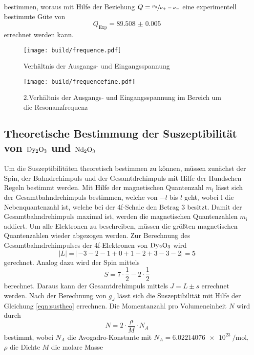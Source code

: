 bestimmen, woraus mit Hilfe der Beziehung $Q = \sfrac{\nu_0}{\nu_+ - \nu_-}$ eine experimentell bestimmte Güte von 
\begin{equation*}
    Q_\text{Exp} = \num{89.508(5)}
\end{equation*}
errechnet werden kann.
\begin{figure}
    \centering
    \caption{Verhältnis der Ausgangs- und Eingangsspannung}
    \label{fig:frequence}
    \texttt{[image: build/frequence.pdf]}
\end{figure}
\begin{figure}
    \centering
    \caption{2.Verhältnis der Ausgangs- und Eingangsspannung im Bereich um die Resonanzfrequenz}
    \label{fig:frequencefine}
    \texttt{[image: build/frequencefine.pdf]}
\end{figure}
\FloatBarrier
\subsection{Theoretische Bestimmung der Suszeptibilität von $\ce{Dy2O3}$ und $\ce{Nd2O3}$}
Um die Suszeptibilitäten theoretisch bestimmen zu können, müssen zunächst der Spin, der Bahndrehimpuls und der Gesamtdrehimpuls mit Hilfe der Hundschen 
Regeln bestimmt werden.
Mit Hilfe der magnetischen Quantenzahl $m_l$ lässt sich der Gesamtbahndrehimpuls bestimmen, welche von $-l$ bis $l$ geht, wobei l die 
Nebenquantenzahl ist, welche bei der 4f-Schale den Betrag $3$ besitzt. 
Damit der Gesamtbahndrehimpuls maximal ist, werden die magnetischen Quantenzahlen $m_l$ addiert. 
Um alle Elektronen zu beschreiben, müssen die größten magnetischen Quantenzahlen wieder abgezogen werden.
Zur Berechnung des Gesamtbahndrehimpulses der 4f-Elektronen von $\ce{Dy2O3}$ wird 
\begin{equation*}
    \lvert L \rvert = \lvert -3 - 2 - 1 + 0 + 1 + 2 + 3 - 3 - 2 \rvert = 5
\end{equation*} 
gerechnet. 
Analog dazu wird der Spin mittels
\begin{equation*}
    S = 7 \cdot \frac{1}{2} - 2  \cdot \frac{1}{2}
\end{equation*}
berechnet. Daraus kann der Gesamtdrehimpuls mittels $J = L \pm s$ errechnet werden.
Nach der Berechnung von $g_J$ lässt sich die Suszeptibilität mit Hilfe der Gleichung \eqref{eqn:sustheo} errechnen.
Die Momentanzahl pro Volumeneinheit $N$ wird durch
\begin{equation}
    N = 2\cdot\frac{\rho}{M}\cdot N_A 
\end{equation}
bestimmt,
wobei $N_A$ die Avogadro-Konstante mit $N_A = \SI{6.02214076e23}{\per\mole}$\cite{avogrado}, $\rho$ die Dichte $M$ die molare Masse 
